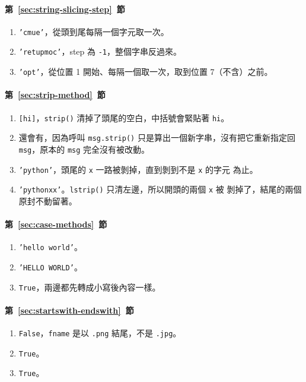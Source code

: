\paragraph{第~\ref{sec:string-slicing-step}~節}
\begin{enumerate}
\item \texttt{'cmue'}，從頭到尾每隔一個字元取一次。
\item \texttt{'retupmoc'}，step 為 \texttt{-1}，整個字串反過來。
\item \texttt{'opt'}，從位置 1 開始、每隔一個取一次，取到位置 7（不含）之前。
\end{enumerate}

\paragraph{第~\ref{sec:strip-method}~節}
\begin{enumerate}
\item \texttt{[hi]}，\texttt{strip()} 清掉了頭尾的空白，中括號會緊貼著 \texttt{hi}。
\item 還會有，因為呼叫 \texttt{msg.strip()} 只是算出一個新字串，沒有把它重新指定回
\texttt{msg}，原本的 \texttt{msg} 完全沒有被改動。
\item \texttt{'python'}，頭尾的 \texttt{x} 一路被剝掉，直到剝到不是 \texttt{x} 的字元
為止。
\item \texttt{'pythonxx'}。\texttt{lstrip()} 只清左邊，所以開頭的兩個 \texttt{x} 被
剝掉了，結尾的兩個原封不動留著。
\end{enumerate}

\paragraph{第~\ref{sec:case-methods}~節}
\begin{enumerate}
\item \texttt{'hello world'}。
\item \texttt{'HELLO WORLD'}。
\item \texttt{True}，兩邊都先轉成小寫後內容一樣。
\end{enumerate}

\paragraph{第~\ref{sec:startswith-endswith}~節}
\begin{enumerate}
\item \texttt{False}，\texttt{fname} 是以 \texttt{.png} 結尾，不是 \texttt{.jpg}。
\item \texttt{True}。
\item \texttt{True}。
\end{enumerate}

